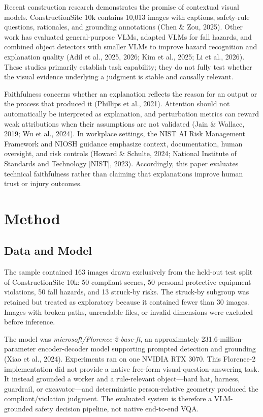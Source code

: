 \documentclass[12pt,letterpaper,twoside]{article}
\begin{document}
Recent construction research demonstrates the promise of contextual visual models. ConstructionSite 10k contains 10,013 images with captions, safety-rule questions, rationales, and grounding annotations (Chen \& Zou, 2025). Other work has evaluated general-purpose VLMs, adapted VLMs for fall hazards, and combined object detectors with smaller VLMs to improve hazard recognition and explanation quality (Adil et al., 2025, 2026; Kim et al., 2025; Li et al., 2026). These studies primarily establish task capability; they do not fully test whether the visual evidence underlying a judgment is stable and causally relevant.

Faithfulness concerns whether an explanation reflects the reason for an output or the process that produced it (Phillips et al., 2021). Attention should not automatically be interpreted as explanation, and perturbation metrics can reward weak attributions when their assumptions are not validated (Jain \& Wallace, 2019; Wu et al., 2024). In workplace settings, the NIST AI Risk Management Framework and NIOSH guidance emphasize context, documentation, human oversight, and risk controls (Howard \& Schulte, 2024; National Institute of Standards and Technology [NIST], 2023). Accordingly, this paper evaluates technical faithfulness rather than claiming that explanations improve human trust or injury outcomes.

\section{Method}

\subsection{Data and Model}

The sample contained 163 images drawn exclusively from the held-out test split of ConstructionSite 10k: 50 compliant scenes, 50 personal protective equipment violations, 50 fall hazards, and 13 struck-by risks. The struck-by subgroup was retained but treated as exploratory because it contained fewer than 30 images. Images with broken paths, unreadable files, or invalid dimensions were excluded before inference.

The model was \textit{microsoft/Florence-2-base-ft}, an approximately 231.6-million-parameter encoder-decoder model supporting prompted detection and grounding (Xiao et al., 2024). Experiments ran on one NVIDIA RTX 3070. This Florence-2 implementation did not provide a native free-form visual-question-answering task. It instead grounded a worker and a rule-relevant object---hard hat, harness, guardrail, or excavator---and deterministic person-relative geometry produced the compliant/violation judgment. The evaluated system is therefore a VLM-grounded safety decision pipeline, not native end-to-end VQA.
\end{document}
